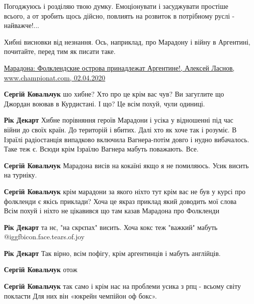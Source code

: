 \begin{itemize}
\begin{itemize}
\end{itemize} %

Погоджуюсь і розділяю твою думку. Емоціонувати і засуджувати простіше всього, а от зробить щось дійсно, повлиять на розвиток в потрібному руслі - найважче!...

Хибні висновки від незнання. Ось, наприклад, про Марадону і війну в Аргентині, почитайте, перед тим як писати таке.

\href{https://www.championat.com/football/news-4009599-maradona-folklendskie-ostrova-prinadlezhat-argentine.html}{%
Марадона: Фолклендские острова принадлежат Аргентине!, Алексей Ласнов, www.championat.com, 02.04.2020%
}

\begin{itemize} %
\textbf{Сергій Ковальчук} шо хибне?
Хто про це крім вас чув?
Ви загуглите що Джордан воював в Курдистані. І що?
Це всім похуй, чули одиниці.

\textbf{Рік Декарт} Хибне порівняння героїв Марадони і усіка у відношенні під час війни до своїх країн. До територій і вбитих. Далі хто як хоче так і розуміє. В Ізраїлі радіостанція випадково включила Вагнера-потім довго і нудно вибачалось. Таке теж є. Всюди крім Ізраїлю Вагнера мабуть поважають. Все.

\textbf{Сергій Ковальчук} Марадона висів на кокаїні якщо я не помиляюсь. Усик висить на турніку.

\textbf{Сергій Ковальчук} крім марадони за якого ніхто тут крім вас не був у курсі про фолкленди є якісь приклади?
Хоча це якраз приклад який доводить мої слова
Всім похуй і ніхто не цікавився що там казав Марадона про Фолкленди

\textbf{Рік Декарт} та нє, "на скрєпах" висить. Хоча кокс теж "важкий" мабуть  @igg{fbicon.face.tears.of.joy} 

\textbf{Рік Декарт} Так вірно, всім пофігу, крім аргентинців і мабуть англійців.

\textbf{Сергій Ковальчук} отож

\textbf{Сергій Ковальчук} так само і крім нас на проблеми усика з рпц - всьому світу покласти
Для них він «юкрейн чемпійон оф бокс».

\end{itemize} %



\end{itemize}
